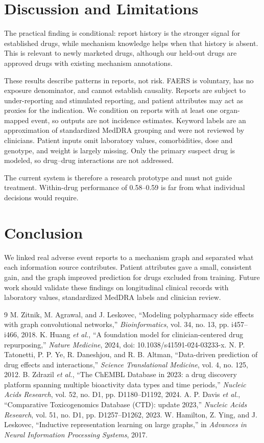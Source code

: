 \documentclass[conference,a4paper]{IEEEtran}
\begin{document}
\section{Discussion and Limitations}
The practical finding is conditional: report history is the stronger signal for established drugs, while mechanism knowledge helps when that history is absent. This is relevant to newly marketed drugs, although our held-out drugs are approved drugs with existing mechanism annotations.

These results describe patterns in reports, not risk. FAERS is voluntary, has no exposure denominator, and cannot establish causality. Reports are subject to under-reporting and stimulated reporting, and patient attributes may act as proxies for the indication. We condition on reports with at least one organ-mapped event, so outputs are not incidence estimates. Keyword labels are an approximation of standardized MedDRA grouping and were not reviewed by clinicians. Patient inputs omit laboratory values, comorbidities, dose and genotype, and weight is largely missing. Only the primary suspect drug is modeled, so drug--drug interactions are not addressed.

The current system is therefore a research prototype and must not guide treatment. Within-drug performance of 0.58--0.59 is far from what individual decisions would require.

\section{Conclusion}
We linked real adverse event reports to a mechanism graph and separated what each information source contributes. Patient attributes gave a small, consistent gain, and the graph improved prediction for drugs excluded from training. Future work should validate these findings on longitudinal clinical records with laboratory values, standardized MedDRA labels and clinician review.

\begin{thebibliography}{9}
 M. Zitnik, M. Agrawal, and J. Leskovec, ``Modeling polypharmacy side effects with graph convolutional networks,'' \emph{Bioinformatics}, vol. 34, no. 13, pp. i457--i466, 2018.
 K. Huang \emph{et al.}, ``A foundation model for clinician-centered drug repurposing,'' \emph{Nature Medicine}, 2024, doi: 10.1038/s41591-024-03233-x.
 N. P. Tatonetti, P. P. Ye, R. Daneshjou, and R. B. Altman, ``Data-driven prediction of drug effects and interactions,'' \emph{Science Translational Medicine}, vol. 4, no. 125, 2012.
 B. Zdrazil \emph{et al.}, ``The ChEMBL Database in 2023: a drug discovery platform spanning multiple bioactivity data types and time periods,'' \emph{Nucleic Acids Research}, vol. 52, no. D1, pp. D1180--D1192, 2024.
 A. P. Davis \emph{et al.}, ``Comparative Toxicogenomics Database (CTD): update 2023,'' \emph{Nucleic Acids Research}, vol. 51, no. D1, pp. D1257--D1262, 2023.
 W. Hamilton, Z. Ying, and J. Leskovec, ``Inductive representation learning on large graphs,'' in \emph{Advances in Neural Information Processing Systems}, 2017.
\end{thebibliography}
\end{document}
